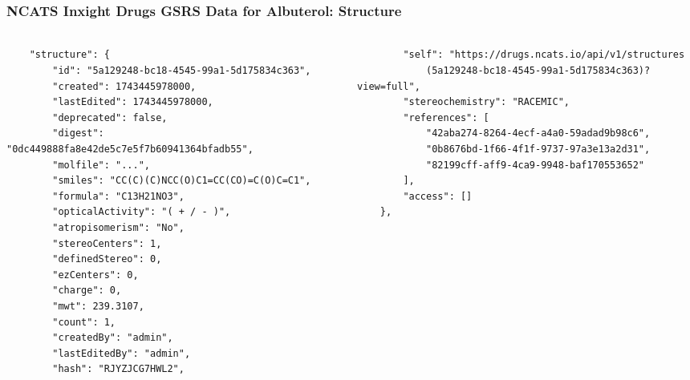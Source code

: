 \documentclass[aspectratio=169,xcolor=dvipsnames]{beamer}
\begin{document}
\begin{frame}[fragile,t]
  \frametitle{NCATS Inxight Drugs GSRS Data for Albuterol: Structure}
  \framesubtitle{}
  \tiny
  \begin{columns}[t]
    \begin{column}{0.5\textwidth}
\begin{verbatim}
    "structure": {
        "id": "5a129248-bc18-4545-99a1-5d175834c363",
        "created": 1743445978000,
        "lastEdited": 1743445978000,
        "deprecated": false,
        "digest": "0dc449888fa8e42de5c7e5f7b60941364bfadb55",
        "molfile": "...",
        "smiles": "CC(C)(C)NCC(O)C1=CC(CO)=C(O)C=C1",
        "formula": "C13H21NO3",
        "opticalActivity": "( + / - )",
        "atropisomerism": "No",
        "stereoCenters": 1,
        "definedStereo": 0,
        "ezCenters": 0,
        "charge": 0,
        "mwt": 239.3107,
        "count": 1,
        "createdBy": "admin",
        "lastEditedBy": "admin",
        "hash": "RJYZJCG7HWL2",
\end{verbatim}
    \end{column}
    \begin{column}{0.5\textwidth}
\begin{verbatim}
        "self": "https://drugs.ncats.io/api/v1/structures
            (5a129248-bc18-4545-99a1-5d175834c363)?view=full",
        "stereochemistry": "RACEMIC",
        "references": [
            "42aba274-8264-4ecf-a4a0-59adad9b98c6",
            "0b8676bd-1f66-4f1f-9737-97a3e13a2d31",
            "82199cff-aff9-4ca9-9948-baf170553652"
        ],
        "access": []
    },
\end{verbatim}
    \end{column}
  \end{columns}
\end{frame}
\end{document}
